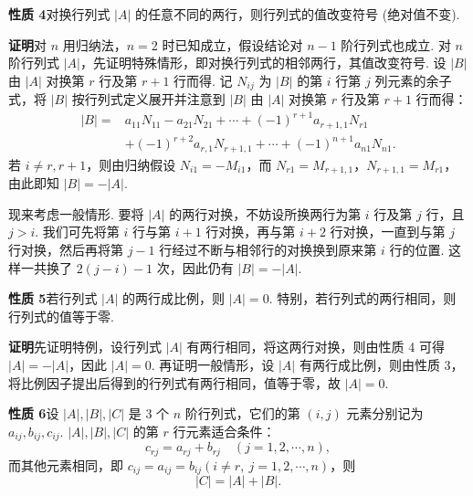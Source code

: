 \documentclass[UTF8,12pt,a4paper,fontset=fandol]{ctexart}
\begin{document}
\noindent\textbf{性质 4}\quad 对换行列式 $|A|$ 的任意不同的两行，则行列式的值改变符号 (绝对值不变).

\noindent\textbf{证明}\quad 对 $n$ 用归纳法，$n=2$ 时已知成立，假设结论对 $n-1$ 阶行列式也成立. 对 $n$ 阶行列式 $|A|$，先证明特殊情形，即对换行列式的相邻两行，其值改变符号. 设 $|B|$ 由 $|A|$ 对换第 $r$ 行及第 $r+1$ 行而得. 记 $N_{ij}$ 为 $|B|$ 的第 $i$ 行第 $j$ 列元素的余子式，将 $|B|$ 按行列式定义展开并注意到 $|B|$ 由 $|A|$ 对换第 $r$ 行及第 $r+1$ 行而得：
\[
\begin{aligned}
|B|={}&a_{11}N_{11}-a_{21}N_{21}+\cdots+(-1)^{r+1}a_{r+1,1}N_{r1}\\
&+(-1)^{r+2}a_{r,1}N_{r+1,1}+\cdots+(-1)^{n+1}a_{n1}N_{n1}.
\end{aligned}
\]
若 $i\ne r,r+1$，则由归纳假设 $N_{i1}=-M_{i1}$，而 $N_{r1}=M_{r+1,1}$，$N_{r+1,1}=M_{r1}$，由此即知 $|B|=-|A|$.

现来考虑一般情形. 要将 $|A|$ 的两行对换，不妨设所换两行为第 $i$ 行及第 $j$ 行，且 $j>i$. 我们可先将第 $i$ 行与第 $i+1$ 行对换，再与第 $i+2$ 行对换，一直到与第 $j$ 行对换，然后再将第 $j-1$ 行经过不断与相邻行的对换换到原来第 $i$ 行的位置. 这样一共换了 $2(j-i)-1$ 次，因此仍有 $|B|=-|A|$.

\noindent\textbf{性质 5}\quad 若行列式 $|A|$ 的两行成比例，则 $|A|=0$. 特别，若行列式的两行相同，则行列式的值等于零.

\noindent\textbf{证明}\quad 先证明特例，设行列式 $|A|$ 有两行相同，将这两行对换，则由性质 4 可得 $|A|=-|A|$，因此 $|A|=0$. 再证明一般情形，设 $|A|$ 有两行成比例，则由性质 3，将比例因子提出后得到的行列式有两行相同，值等于零，故 $|A|=0$.

\noindent\textbf{性质 6}\quad 设 $|A|,|B|,|C|$ 是 3 个 $n$ 阶行列式，它们的第 $(i,j)$ 元素分别记为 $a_{ij},b_{ij},c_{ij}$. $|A|,|B|,|C|$ 的第 $r$ 行元素适合条件：
\begin{equation}
c_{rj}=a_{rj}+b_{rj}\quad (j=1,2,\cdots,n),
\tag{1.3.6}
\end{equation}
而其他元素相同，即 $c_{ij}=a_{ij}=b_{ij}(i\ne r,\ j=1,2,\cdots,n)$，则
\[
|C|=|A|+|B|.
\]
\end{document}
